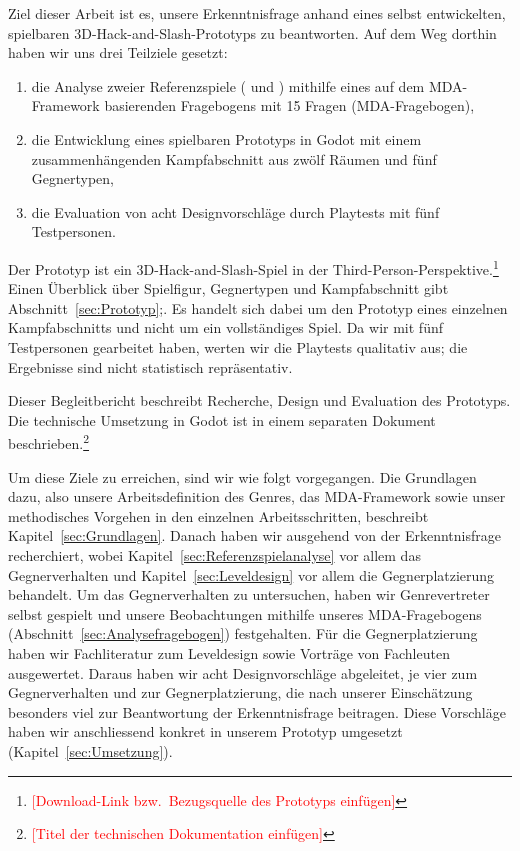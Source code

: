 \documentclass[../Main.tex]{subfiles}
\begin{document}
Ziel dieser Arbeit ist es, unsere Erkenntnisfrage anhand eines selbst entwickelten, spielbaren 3D-Hack-and-Slash-Prototyps zu beantworten. Auf dem Weg dorthin haben wir uns drei Teilziele gesetzt:

\begin{enumerate}
    \item die Analyse zweier Referenzspiele ( und ) mithilfe eines auf dem MDA-Framework basierenden Fragebogens mit 15 Fragen (MDA-Fragebogen),
    \item die Entwicklung eines spielbaren Prototyps in Godot mit einem zusammenhängenden Kampfabschnitt aus zwölf Räumen und fünf Gegnertypen,
    \item die Evaluation von acht Designvorschläge durch Playtests mit fünf Testpersonen.
\end{enumerate}

Der Prototyp ist ein 3D-Hack-and-Slash-Spiel in der Third-Person-Perspektive.\footnote{\textcolor{red}{[Download-Link bzw.\ Bezugsquelle des Prototyps einfügen]}} Einen Überblick über Spielfigur, Gegnertypen und Kampfabschnitt gibt Abschnitt~\ref{sec:Prototyp};. Es handelt sich dabei um den Prototyp eines einzelnen Kampfabschnitts und nicht um ein vollständiges Spiel. Da wir mit fünf Testpersonen gearbeitet haben, werten wir die Playtests qualitativ aus; die Ergebnisse sind nicht statistisch repräsentativ.

Dieser Begleitbericht beschreibt Recherche, Design und Evaluation des Prototyps. Die technische Umsetzung in Godot ist in einem separaten Dokument beschrieben.\footnote{\textcolor{red}{[Titel der technischen Dokumentation einfügen]}}

Um diese Ziele zu erreichen, sind wir wie folgt vorgegangen. Die Grundlagen dazu, also unsere Arbeitsdefinition des Genres, das MDA-Framework sowie unser methodisches Vorgehen in den einzelnen Arbeitsschritten, beschreibt Kapitel~\ref{sec:Grundlagen}. Danach haben wir ausgehend von der Erkenntnisfrage recherchiert, wobei Kapitel~\ref{sec:Referenzspielanalyse} vor allem das Gegnerverhalten und Kapitel~\ref{sec:Leveldesign} vor allem die Gegnerplatzierung behandelt. Um das Gegnerverhalten zu untersuchen, haben wir Genrevertreter selbst gespielt und unsere Beobachtungen mithilfe unseres MDA-Fragebogens (Abschnitt~\ref{sec:Analysefragebogen}) festgehalten. Für die Gegnerplatzierung haben wir Fachliteratur zum Leveldesign\autocite{totten2014architectural,rogers2014levelup} sowie Vorträge von Fachleuten ausgewertet. Daraus haben wir acht Designvorschläge abgeleitet, je vier zum Gegnerverhalten und zur Gegnerplatzierung, die nach unserer Einschätzung besonders viel zur Beantwortung der Erkenntnisfrage beitragen. Diese Vorschläge haben wir anschliessend konkret in unserem Prototyp umgesetzt (Kapitel~\ref{sec:Umsetzung}).
\end{document}
